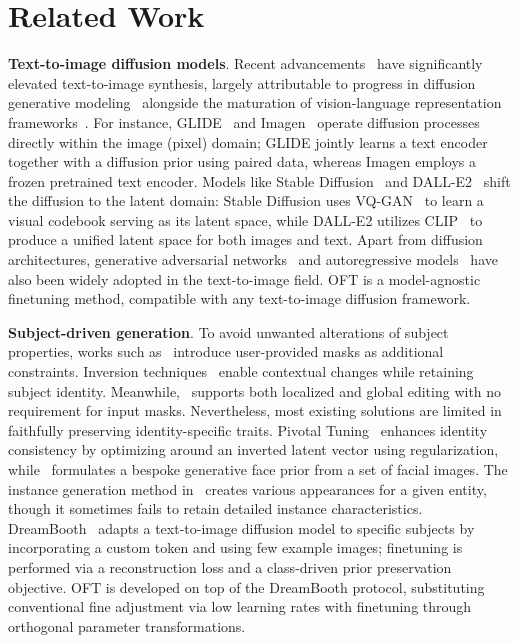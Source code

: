 \section{Related Work}

\textbf{Text-to-image diffusion models}. Recent advancements~\cite{saharia2022photorealistic,ramesh2022hierarchical,rombach2022high,gu2022vector,nichol2022glide} have significantly elevated text-to-image synthesis, largely attributable to progress in diffusion generative modeling~\cite{ho2020denoising,song2021score,song2021denoising,dhariwal2021diffusion} alongside the maturation of vision-language representation frameworks~\cite{su2020vlbert,lu2019vilbert,radford2021learning,wang2021simvlm,li2022blip,li2023blip,alayrac2022flamingo,schuhmann2022laion}. For instance, GLIDE~\cite{nichol2022glide} and Imagen~\cite{saharia2022photorealistic} operate diffusion processes directly within the image (pixel) domain; GLIDE jointly learns a text encoder together with a diffusion prior using paired data, whereas Imagen employs a frozen pretrained text encoder. Models like Stable Diffusion~\cite{rombach2022high} and DALL-E2~\cite{ramesh2022hierarchical} shift the diffusion to the latent domain: Stable Diffusion uses VQ-GAN~\cite{esser2021taming} to learn a visual codebook serving as its latent space, while DALL-E2 utilizes CLIP~\cite{radford2021learning} to produce a unified latent space for both images and text. Apart from diffusion architectures, generative adversarial networks~\cite{reed2016generative,zhang2017stackgan,xu2018attngan,li2019controllable} and autoregressive models~\cite{ramesh2021zero,ding2021cogview,wu2022nuwa,yuscaling} have also been widely adopted in the text-to-image field. OFT is a model-agnostic finetuning method, compatible with any text-to-image diffusion framework.

\textbf{Subject-driven generation}. To avoid unwanted alterations of subject properties, works such as~\cite{avrahami2022blended,nichol2022glide} introduce user-provided masks as additional constraints. Inversion techniques~\cite{choi2021ilvr,dhariwal2021diffusion,ramesh2022hierarchical,gal2022image} enable contextual changes while retaining subject identity. Meanwhile,~\cite{hertz2022prompt} supports both localized and global editing with no requirement for input masks. Nevertheless, most existing solutions are limited in faithfully preserving identity-specific traits. Pivotal Tuning~\cite{roich2022pivotal} enhances identity consistency by optimizing around an inverted latent vector using regularization, while~\cite{nitzan2022mystyle} formulates a bespoke generative face prior from a set of facial images. The instance generation method in~\cite{casanova2021instance} creates various appearances for a given entity, though it sometimes fails to retain detailed instance characteristics. DreamBooth~\cite{ruiz2023dreambooth} adapts a text-to-image diffusion model to specific subjects by incorporating a custom token and using few example images; finetuning is performed via a reconstruction loss and a class-driven prior preservation objective. OFT is developed on top of the DreamBooth protocol, substituting conventional fine adjustment via low learning rates with finetuning through orthogonal parameter transformations.

